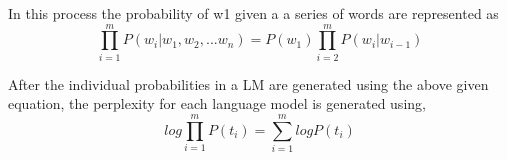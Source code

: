 In this process the probability of w1 given a a series of words are represented as 
\begin{equation}\label{eqn1}
\prod_{i=1}^m P(w_i | w_1, w_2,...w_n) = P(w_1)  \prod_{i=2}^m P(w_i | w_{i-1})
\end{equation}

After the individual probabilities in a LM are generated using the above given equation, the perplexity for each language model is generated using, 
\begin{equation}\label{eqn2}
log \prod_{i=1}^m P(t_i)= \sum_{i=1}^m log P(t_i)
\end{equation}
